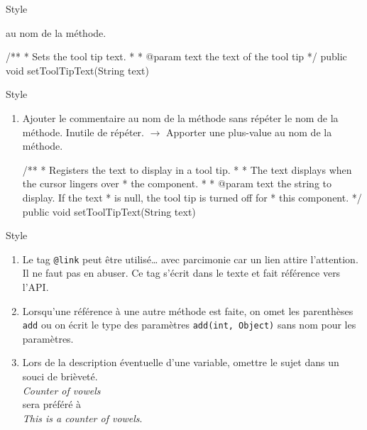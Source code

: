\begin{hideedit}
\begin{frame}[fragile]{Style}
\begin{enumerate}
      au nom de la méthode.\\
      \begin{wrong}
      \begin{java}
/**
  * Sets the tool tip text.
  *
  * @param text the text of the tool tip
  */
  public void setToolTipText(String text)
      \end{java}
      \end{wrong}
  \end{enumerate}
\end{frame}
\begin{frame}[fragile]{Style}
  \begin{enumerate}
    \conti
    \item Ajouter le commentaire au nom de la méthode sans répéter le nom de la
      méthode. Inutile de répéter. \(\rightarrow\) Apporter une plus-value
      au nom de la méthode.\\
      \begin{java}
/**
  * Registers the text to display in a tool tip.
  *
  * The text displays when the cursor lingers over
  * the component.
  *
  * @param text the string to display. If the text
  * is null, the tool tip is turned off for
  * this component.
  */
  public void setToolTipText(String text)
      \end{java}
    \seti
  \end{enumerate}
\end{frame}
\begin{frame}[fragile]{Style}
  \begin{enumerate}[<+->]
    \conti
    \item Le tag \texttt{@link} peut être utilisé… avec parcimonie car un lien
      attire l'attention. Il ne faut pas en abuser. Ce tag s'écrit dans le
      texte et fait référence vers l'API.

    \item Lorsqu'une référence à une autre méthode est faite, on omet les
      parenthèses \texttt{add} ou on écrit le type des paramètres
      \texttt{add(int, Object)} sans nom pour les paramètres.

    \item Lors de la description éventuelle d'une variable, omettre le sujet
      dans un souci de brièveté.\\
      \medskip
      \quad\textit{Counter of vowels}\\
      sera préféré à\\
      \quad\textit{This is a counter of vowels}.


\end{enumerate}
\end{frame}
\end{hideedit}
